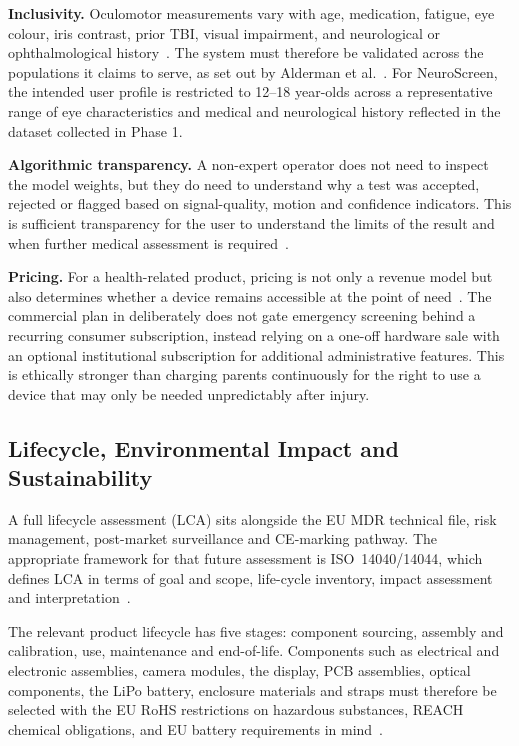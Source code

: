 \textbf{Inclusivity.} Oculomotor measurements vary with age, medication, fatigue, eye colour, iris contrast, prior TBI, visual impairment, and neurological or ophthalmological history~\cite{ortega2022medicalhistory,bergamini1998iriscolour}. The system must therefore be validated across the populations it claims to serve, as set out by Alderman et al.~\cite{alderman2024aitransparency}. For NeuroScreen, the intended user profile is restricted to 12--18 year-olds across a representative range of eye characteristics and medical and neurological history reflected in the dataset collected in Phase 1.

\textbf{Algorithmic transparency.} A non-expert operator does not need to inspect the model weights, but they do need to understand why a test was accepted, rejected or flagged based on signal-quality, motion and confidence indicators. This is sufficient transparency for the user to understand the limits of the result and when further medical assessment is required~\cite{alderman2024aitransparency,who_aiethics2021}.

\textbf{Pricing.} For a health-related product, pricing is not only a revenue model but also determines whether a device remains accessible at the point of need~\cite{who_pricing}. The commercial plan in  deliberately does not gate emergency screening behind a recurring consumer subscription, instead relying on a one-off hardware sale with an optional institutional subscription for additional administrative features. This is ethically stronger than charging parents continuously for the right to use a device that may only be needed unpredictably after injury.

\subsection{Lifecycle, Environmental Impact and Sustainability}

A full lifecycle assessment (LCA) sits alongside the EU MDR technical file, risk management, post-market surveillance and CE-marking pathway. The appropriate framework for that future assessment is ISO~14040/14044, which defines LCA in terms of goal and scope, life-cycle inventory, impact assessment and interpretation~\cite{iso14040}.

The relevant product lifecycle has five stages: component sourcing, assembly and calibration, use, maintenance and end-of-life. Components such as electrical and electronic assemblies, camera modules, the display, PCB assemblies, optical components, the LiPo battery, enclosure materials and straps must therefore be selected with the EU RoHS restrictions on hazardous substances, REACH chemical obligations, and EU battery requirements in mind~\cite{eu_rohs,eu_reach,eu_batteries}.

